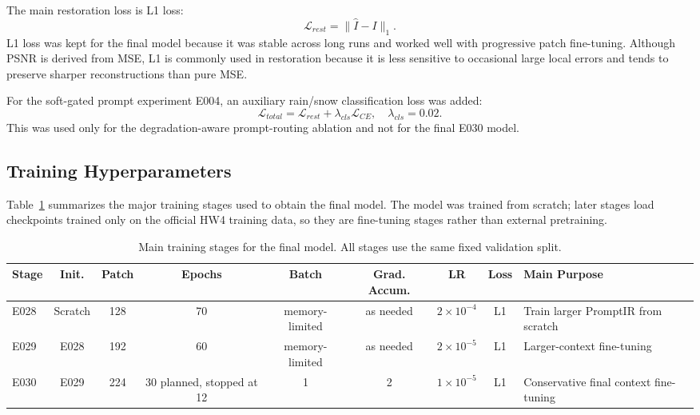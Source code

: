 \documentclass[10pt,conference]{article}
\begin{document}
The main restoration loss is L1 loss:
\begin{equation}
    \mathcal{L}_{rest} = \|\hat{I} - I\|_1.
\end{equation}
L1 loss was kept for the final model because it was stable across long runs and worked well with progressive patch fine-tuning. Although PSNR is derived from MSE, L1 is commonly used in restoration because it is less sensitive to occasional large local errors and tends to preserve sharper reconstructions than pure MSE.

For the soft-gated prompt experiment E004, an auxiliary rain/snow classification loss was added:
\begin{equation}
    \mathcal{L}_{total} = \mathcal{L}_{rest} + \lambda_{cls}\mathcal{L}_{CE}, \quad \lambda_{cls}=0.02.
\end{equation}
This was used only for the degradation-aware prompt-routing ablation and not for the final E030 model.

\subsection{Training Hyperparameters}

Table~\ref{tab:training_settings} summarizes the major training stages used to obtain the final model. The model was trained from scratch; later stages load checkpoints trained only on the official HW4 training data, so they are fine-tuning stages rather than external pretraining.

\begin{table}[t]
\centering
\caption{Main training stages for the final model. All stages use the same fixed validation split.}
\label{tab:training_settings}
\begin{tabular}{lcccccccl}
\toprule
Stage & Init. & Patch & Epochs & Batch & Grad. Accum. & LR & Loss & Main Purpose \\
\midrule
E028 & Scratch & 128 & 70 & memory-limited & as needed & $2\times10^{-4}$ & L1 & Train larger PromptIR from scratch \\
E029 & E028 & 192 & 60 & memory-limited & as needed & $2\times10^{-5}$ & L1 & Larger-context fine-tuning \\
E030 & E029 & 224 & 30 planned, stopped at 12 & 1 & 2 & $1\times10^{-5}$ & L1 & Conservative final context fine-tuning \\
\bottomrule
\end{tabular}
\end{table}
\end{document}
